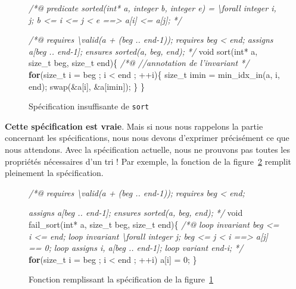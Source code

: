 \documentclass[12pt,francais,]{scrbook}
\newenvironment{Shaded}{}{}
\newcommand{\KeywordTok}[1]{\textcolor[rgb]{0.00,0.44,0.13}{\textbf{{#1}}}}
\newcommand{\DataTypeTok}[1]{\textcolor[rgb]{0.56,0.13,0.00}{{#1}}}
\newcommand{\DecValTok}[1]{\textcolor[rgb]{0.25,0.63,0.44}{{#1}}}
\newcommand{\CommentTok}[1]{\textcolor[rgb]{0.38,0.63,0.69}{\textit{{#1}}}}
\newcommand{\NormalTok}[1]{{#1}}
\begin{document}
\begin{figure}
\begin{footnotesize}\begin{Shaded}
\begin{Highlighting}[]
\CommentTok{/*@}
\CommentTok{  predicate sorted(int* a, integer b, integer e) =}
\CommentTok{    \textbackslash{}forall integer i, j; b <= i <= j < e ==> a[i] <= a[j];}
\CommentTok{*/}

\CommentTok{/*@}
\CommentTok{  requires \textbackslash{}valid(a + (beg .. end-1));}
\CommentTok{  requires beg < end;}
\CommentTok{  assigns  a[beg .. end-1];}
\CommentTok{  ensures sorted(a, beg, end);}
\CommentTok{*/}
\DataTypeTok{void} \NormalTok{sort(}\DataTypeTok{int}\NormalTok{* a, size_t beg, size_t end)\{}
  \CommentTok{/*@ //annotation de l'invariant */}
  \KeywordTok{for}\NormalTok{(size_t i = beg ; i < end ; ++i)\{}
    \NormalTok{size_t imin = min_idx_in(a, i, end);}
    \NormalTok{swap(&a[i], &a[imin]);}
  \NormalTok{\}}
\NormalTok{\}}
\end{Highlighting}
\end{Shaded}\end{footnotesize}
\caption{Spécification insuffisante de \texttt{sort}}
\label{fig:6-1-5-insuff}
\end{figure}

\textbf{Cette spécification est vraie}. Mais si nous nous rappelons la
partie concernant les spécifications, nous nous devons d'exprimer
précisément ce que nous attendons. Avec la spécification actuelle, nous
ne prouvons pas toutes les propriétés nécessaires d'un tri ! Par
exemple, la fonction de la figure~\ref{fig:6-1-5-sort-faux}
remplit pleinement la spécification.

\begin{figure}
\begin{footnotesize}\begin{Shaded}
\begin{Highlighting}[]
\CommentTok{/*@}
\CommentTok{  requires \textbackslash{}valid(a + (beg .. end-1));}
\CommentTok{  requires beg < end;}

\CommentTok{  assigns  a[beg .. end-1];}
\CommentTok{  }
\CommentTok{  ensures sorted(a, beg, end);}
\CommentTok{*/}
\DataTypeTok{void} \NormalTok{fail_sort(}\DataTypeTok{int}\NormalTok{* a, size_t beg, size_t end)\{}
  \CommentTok{/*@}
\CommentTok{    loop invariant beg <= i <= end;}
\CommentTok{    loop invariant \textbackslash{}forall integer j; beg <= j < i ==> a[j] == 0;}
\CommentTok{    loop assigns i, a[beg .. end-1];}
\CommentTok{    loop variant end-i;}
\CommentTok{  */}
  \KeywordTok{for}\NormalTok{(size_t i = beg ; i < end ; ++i)}
    \NormalTok{a[i] = }\DecValTok{0}\NormalTok{;}
\NormalTok{\}}
\end{Highlighting}
\end{Shaded}\end{footnotesize}
\caption{Fonction remplissant la spécification de la figure~\ref{fig:6-1-5-insuff}}
\label{fig:6-1-5-sort-faux}
\end{figure}
\end{document}
